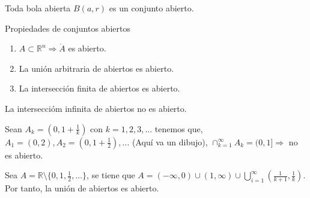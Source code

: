 \begin{prop}
Toda bola abierta $B(a,r)$ es un conjunto abierto.
\end{prop}

\begin{prop}
Propiedades de conjuntos abiertos
\begin{enumerate}[label=(\roman*)]
    \item $A \subset \mathbb{R}^n \Rightarrow \mathring{A}$ es abierto.
    \item La unión arbitraria de abiertos es abierto.
    \item La intersección finita de abiertos es abierto.
\end{enumerate}
\end{prop}

\begin{obs}
La interseccióm infinita de abiertos no es abierto.
\end{obs}

\begin{ejm}
Sean $A_k = (0,1 + \frac{1}{k})$ con $ k = 1,2,3,...$ tenemos que, $A_1 = (0,2), A_2 = (0,1 + \frac{1}{2}), ...$ (Aquí va un dibujo), $ \cap_{k=1}^{\infty} A_k = (0,1] \Rightarrow$ no es abierto.
\end{ejm}

\begin{ejm}
Sea $A = \mathbb{R} \setminus\{ 0, 1, \frac{1}{2}, ... \}$, se tiene que $ A = (-\infty,0)\cup(1,\infty) \cup \bigcup_{i=1}^\infty (\frac{1}{k + 1},\frac{1}{k})$. Por tanto, la unión de abiertos es abierto.
\end{ejm}

